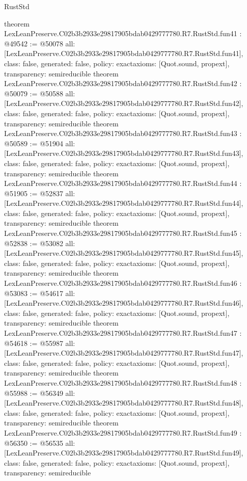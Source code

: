 \begin{lexlean}{RustStd}
\begin{coremodule}
{}
theorem LexLeanPreserve.C02b3b2933e29817905bdab0429777780.R7.RustStd.fun41 : @49542 := @50078 {
  all: [LexLeanPreserve.C02b3b2933e29817905bdab0429777780.R7.RustStd.fun41],
  class: false,
  generated: false,
  policy: exact{axioms: [Quot.sound, propext]},
  transparency: semireducible
}
theorem LexLeanPreserve.C02b3b2933e29817905bdab0429777780.R7.RustStd.fun42 : @50079 := @50588 {
  all: [LexLeanPreserve.C02b3b2933e29817905bdab0429777780.R7.RustStd.fun42],
  class: false,
  generated: false,
  policy: exact{axioms: [Quot.sound, propext]},
  transparency: semireducible
}
theorem LexLeanPreserve.C02b3b2933e29817905bdab0429777780.R7.RustStd.fun43 : @50589 := @51904 {
  all: [LexLeanPreserve.C02b3b2933e29817905bdab0429777780.R7.RustStd.fun43],
  class: false,
  generated: false,
  policy: exact{axioms: [Quot.sound, propext]},
  transparency: semireducible
}
theorem LexLeanPreserve.C02b3b2933e29817905bdab0429777780.R7.RustStd.fun44 : @51905 := @52837 {
  all: [LexLeanPreserve.C02b3b2933e29817905bdab0429777780.R7.RustStd.fun44],
  class: false,
  generated: false,
  policy: exact{axioms: [Quot.sound, propext]},
  transparency: semireducible
}
theorem LexLeanPreserve.C02b3b2933e29817905bdab0429777780.R7.RustStd.fun45 : @52838 := @53082 {
  all: [LexLeanPreserve.C02b3b2933e29817905bdab0429777780.R7.RustStd.fun45],
  class: false,
  generated: false,
  policy: exact{axioms: [Quot.sound, propext]},
  transparency: semireducible
}
theorem LexLeanPreserve.C02b3b2933e29817905bdab0429777780.R7.RustStd.fun46 : @53083 := @54617 {
  all: [LexLeanPreserve.C02b3b2933e29817905bdab0429777780.R7.RustStd.fun46],
  class: false,
  generated: false,
  policy: exact{axioms: [Quot.sound, propext]},
  transparency: semireducible
}
theorem LexLeanPreserve.C02b3b2933e29817905bdab0429777780.R7.RustStd.fun47 : @54618 := @55987 {
  all: [LexLeanPreserve.C02b3b2933e29817905bdab0429777780.R7.RustStd.fun47],
  class: false,
  generated: false,
  policy: exact{axioms: [Quot.sound, propext]},
  transparency: semireducible
}
theorem LexLeanPreserve.C02b3b2933e29817905bdab0429777780.R7.RustStd.fun48 : @55988 := @56349 {
  all: [LexLeanPreserve.C02b3b2933e29817905bdab0429777780.R7.RustStd.fun48],
  class: false,
  generated: false,
  policy: exact{axioms: [Quot.sound, propext]},
  transparency: semireducible
}
theorem LexLeanPreserve.C02b3b2933e29817905bdab0429777780.R7.RustStd.fun49 : @56350 := @56535 {
  all: [LexLeanPreserve.C02b3b2933e29817905bdab0429777780.R7.RustStd.fun49],
  class: false,
  generated: false,
  policy: exact{axioms: [Quot.sound, propext]},
  transparency: semireducible
}
\end{coremodule}
\end{lexlean}
